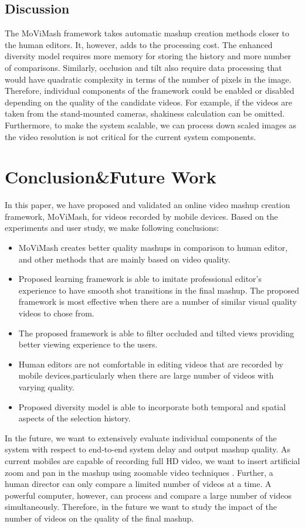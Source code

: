 \documentclass{sig-alternate}
\begin{document}
\subsection{Discussion}
The MoViMash framework takes automatic mashup creation methods closer to the human editors. It, however, adds to the processing cost. The enhanced diversity model requires more memory for storing the history and more number of comparisons. Similarly, occlusion and tilt also require data processing that would have quadratic complexity in terms of the number of pixels in the image. Therefore, individual components of the framework could be enabled or disabled depending on the quality of the candidate videos. For example, if the videos are taken from the stand-mounted cameras, shakiness calculation can be omitted. Furthermore, to make the system scalable, we can process down scaled images as the video resolution is not critical for the current system components.
\section{Conclusion\&Future Work}
In this paper, we have proposed and validated an online video mashup creation framework, MoViMash, for videos recorded by mobile devices. Based on the experiments and user study, we make following conclusions: 
\begin{itemize}
\item MoViMash creates better quality mashups in comparison to human editor, and other methods that are mainly based on video quality.
 \item Proposed learning framework is able to imitate professional editor’s experience to have smooth shot transitions in the ﬁnal mashup. The proposed framework is most effective when there are a number of similar visual quality videos to chose from. 
\item The proposed framework is able to ﬁlter occluded and tilted views providing better viewing experience to the users. 
\item Human editors are not comfortable in editing videos that are recorded by mobile devices,particularly when there are large number of videos with varying quality. 
\item Proposed diversity model is able to incorporate both temporal and spatial aspects of the selection history.
\end{itemize}
In the future, we want to extensively evaluate individual components of the system with respect to end-to-end system delay and output mashup quality. As current mobiles are capable of recording full HD video, we want to insert artiﬁcial zoom and pan in the mashup using zoomable video techniques \cite{economou1983green}. Further, a human director can only compare a limited number of videos at a time. A powerful computer, however, can process and compare a large number of videos simultaneously. Therefore, in the future we want to study the impact of the number of videos on \cite{cabrera2001path} the quality of the ﬁnal mashup.
\end{document}
